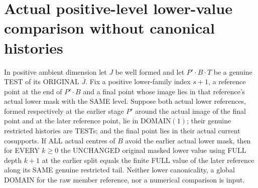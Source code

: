 \section{Actual positive-level lower-value comparison without canonical histories}

\begin{theorem}
\label{hir:original-positive-curve-lower-value-rebase}
\leanok
In positive ambient dimension let $J$ be well formed and let
$P'\mathbin{\cdot}B\mathbin{\cdot}T$ be a genuine TEST of its ORIGINAL
$\bar J$. Fix a positive lower-family index $s+1$, a reference point at the end of
$P'\mathbin{\cdot}B$ and a final point whose image lies in that reference's
actual lower mask with the SAME level. Suppose both actual lower
references, formed respectively at the earlier stage $P'$ around the
actual image of the final point and at the later reference point, lie in
DOMAIN$(1)$; their genuine restricted histories are TESTs; and the final
point lies in their actual current cosupports. If ALL actual centres of
$B$ avoid the earlier actual lower mask, then for EVERY $k\ge0$ the
UNCHANGED original masked lower value using FULL depth $k+1$ at the
earlier split equals the finite FULL value of the later reference along
its SAME genuine restricted tail. Neither lower canonicality, a global
DOMAIN for the raw member reference, nor a numerical comparison is input.
\end{theorem}
